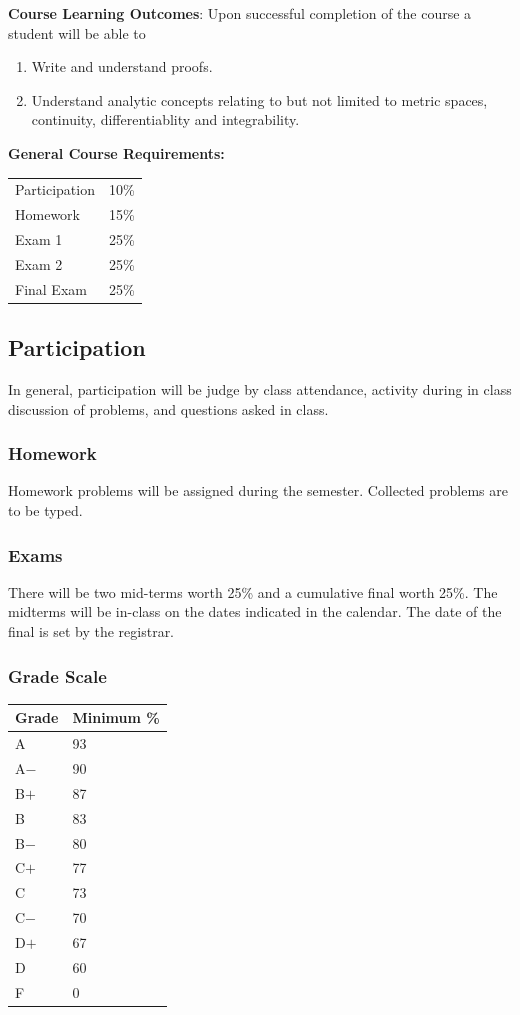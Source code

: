 \documentclass[11pt]{article}
\begin{document}
{\bf Course Learning Outcomes}: Upon successful completion of the course a student will be able to 
\begin{enumerate}[---]
\item Write and understand proofs.	
\item Understand analytic concepts relating to but not limited to metric spaces, continuity, differentiablity and integrability.
\end{enumerate}

{\bf General Course Requirements:} 
\begin{center}
{\renewcommand{\arraystretch}{1.2}%
\begin{tabular}{|l|r|}
\hline
Participation & 10\%\\
Homework & 15\%\\
Exam 1& 25\% \\
Exam 2& 25\% \\
Final Exam& 25\% \\
\hline
\end{tabular}}
\end{center}
\subsection*{Participation}
In general, participation will be judge by class attendance, activity during in class discussion of problems, and questions asked in class.  
\subsubsection*{Homework}
Homework problems will be assigned during the semester. Collected problems are to be typed. 
\subsubsection*{Exams}
There will be two mid-terms worth 25\% and a cumulative final worth 25\%. The midterms will be in-class on the dates indicated in the calendar. The date of the final is set by the registrar. 
\subsubsection*{Grade Scale}
\begin{center}
{\renewcommand{\arraystretch}{1.2}%
\begin{tabular}{|l|l|}
\hline
Grade & Minimum \%\\
\hline
 A& 93\\
 A$-$& 90\\
 B$+$& 87\\
  B& 83\\
 B$-$& 80\\
C$+$& 77\\
 C& 73\\
 C$-$& 70\\
 D$+$& 67\\
 D& 60\\
 F& 0\\
\hline
\end{tabular}}
\end{center}
\end{document}
